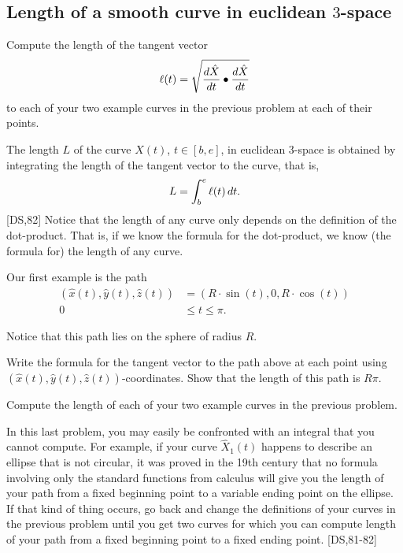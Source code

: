 \documentclass{ximera}
\begin{document}
\subsection*{Length of a smooth curve in euclidean $3$-space}

\begin{problem}
Compute the length of the tangent vector
\[
\l(t)=\sqrt{\frac{d\hat{X}}{dt}\bullet\frac{d\hat{X}}{dt}}%
\]
to each of your two example curves in the previous problem at each of
their points.
\end{problem}

\begin{definition}
The length $L$ of the curve $\hat{X}(t)$, $t\in[b,e] $, in euclidean
$3$-space is obtained by integrating the length of the tangent vector
to the curve, that is,%
\[
L=\int_{b}^{e} \ell(t)  \,dt.
\]
[DS,82] Notice that the length of any curve only depends on the definition of
the dot-product. That is, if we know the formula for the dot-product, we know
(the formula for) the length of any curve.
\end{definition}

Our first example is the path%
\begin{align*}
\left(  \hat{x}\left(  t\right)  ,\hat{y}\left(  t\right)  ,\hat{z}\left(
t\right)  \right)   &  =\left(  R\cdot \sin\left(  t\right)  ,0,R\cdot
\cos\left(  t\right)  \right) \label{6}\\
0\,  &  \leq t\leq\pi.
\end{align*}


Notice that this path lies on the sphere of radius $R$.

\begin{problem}
Write the formula for the tangent vector to the path above at each
point using
$\left(\hat{x}(t),\hat{y}(t),\hat{z}(t)\right)$-coordinates. Show that
the length of this path is $R\pi$.
\end{problem}

\begin{problem}
Compute the length of each of your two example curves in the previous
problem.
\end{problem}

\begin{remark}
In this last problem, you may easily be confronted with an integral
that you cannot compute. For example, if your curve $\hat{X}_{1}\left(
t\right) $ happens to describe an ellipse that is not circular, it was
proved in the 19th century that no formula involving only the
standard functions from calculus will give you the length of your path
from a fixed beginning point to a variable ending point on the
ellipse. If that kind of thing occurs, go back and change the
definitions of your curves in the previous problem until you get two
curves for which you can compute length of your path from a fixed
beginning point to a fixed ending point. [DS,81-82]
\end{remark}
\end{document}
